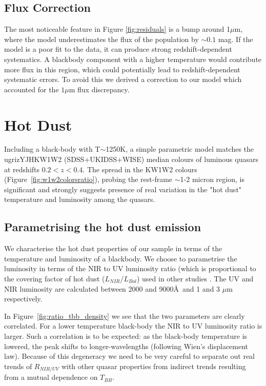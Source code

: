 \subsection{Flux Correction}

The most noticeable feature in Figure \ref{fig:residuals} is a bump around 1$\mu$m, where the model underestimates the flux of the population by $\sim 0.1$ mag. 
If the model is a poor fit to the data, it can produce strong redshift-dependent systematics. 
A blackbody component with a higher temperature would contribute more flux in this region, which could potentially lead to redshift-dependent systematic errors. 
To avoid this we derived a correction to our model which accounted for the $1 \mu$m flux discrepancy. 

\section{Hot Dust}

Including a black-body with T$\sim$1250K, a simple parametric model matches the ugrizYJHKW1W2 (SDSS+UKIDSS+WISE) median colours of luminous quasars at redshifts $0.2 < z < 0.4$. 
The spread in the KW1W2 colours (Figure~\ref{fig:w1w2colorsratio}), probing the rest-frame $\sim$1-2 micron region, is significant and strongly suggests presence of real variation in the "hot dust" temperature and luminosity among the quasars. 

\subsection{Parametrising the hot dust emission}

We characterise the hot dust properties of our sample in terms of the temperature and luminosity of a blackbody.  
We choose to parametrise the luminosity in terms of the NIR to UV luminosity ratio (which is proportional to the covering factor of hot dust ($L_{NIR}/L_{Bol}$) used in other studies \citep{roseboom13}. 
The UV and NIR luminosity are calculated between 2000 and 9000\AA\, and 1 and 3 $\mu$m respectively.

In Figure~\ref{fig:ratio_tbb_density} we see that the two parameters are clearly correlated. 
For a lower temperature black-body the NIR to UV luminosity ratio is larger. 
Such a correlation is to be expected: as the black-body temperature is lowered, the peak shifts to longer-wavelengths (following Wien's displacement law). 
Because of this degeneracy we need to be very careful to separate out real trends of $R_{NIR/UV}$ with other quasar properties from indirect trends resulting from a mutual dependence on $T_{BB}$.  

